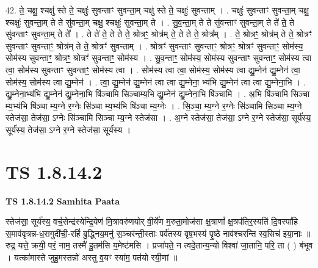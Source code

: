 \documentclass[17pt]{extarticle}
\begin{document}
42. ते॒ चक्षु॒ श्चक्षु॑ स्ते ते॒ चक्षुः॑ सुवन्ताꣳ सुवन्ता॒म् चक्षु॑ स्ते ते॒ चक्षुः॑ सुवन्ताम् । . चक्षुः॑ सुवन्ताꣳ सुवन्ता॒म् चक्षु॒ श्चक्षुः॑ सुवन्ता॒म् ते ते सु॑वन्ता॒म् चक्षु॒ श्चक्षुः॑ सुवन्ता॒म् ते । . सु॒व॒न्ता॒म् ते ते सु॑वन्ताꣳ सुवन्ता॒म् ते ते॑ ते॒ ते सु॑वन्ताꣳ सुवन्ता॒म् ते ते᳚ । . ते ते॑ ते॒ ते ते ते॒ श्रोत्रꣳ॒॒ श्रोत्र॑म् ते॒ ते ते ते॒ श्रोत्र᳚म् । . ते॒ श्रोत्रꣳ॒॒ श्रोत्र॑म् ते ते॒ श्रोत्रꣳ॑ सुवन्ताꣳ सुवन्ताꣳ॒॒ श्रोत्र॑म् ते ते॒ श्रोत्रꣳ॑ सुवन्ताम् । . श्रोत्रꣳ॑ सुवन्ताꣳ सुवन्ताꣳ॒॒ श्रोत्रꣳ॒॒ श्रोत्रꣳ॑ सुवन्ताꣳ॒॒ सोम॑स्य॒ सोम॑स्य सुवन्ताꣳ॒॒ श्रोत्रꣳ॒॒ श्रोत्रꣳ॑ सुवन्ताꣳ॒॒ सोम॑स्य । . सु॒व॒न्ताꣳ॒॒ सोम॑स्य॒ सोम॑स्य सुवन्ताꣳ सुवन्ताꣳ॒॒ सोम॑स्य त्वा त्वा॒ सोम॑स्य सुवन्ताꣳ सुवन्ताꣳ॒॒ सोम॑स्य त्वा । . सोम॑स्य त्वा त्वा॒ सोम॑स्य॒ सोम॑स्य त्वा द्यु॒म्नेन॑ द्यु॒म्नेन॑ त्वा॒ सोम॑स्य॒ सोम॑स्य त्वा द्यु॒म्नेन॑ । . त्वा॒ द्यु॒म्नेन॑ द्यु॒म्नेन॑ त्वा त्वा द्यु॒म्नेना॒ भ्य॑भि द्यु॒म्नेन॑ त्वा त्वा द्यु॒म्नेना॒भि । . द्यु॒म्नेना॒भ्य॑भि द्यु॒म्नेन॑ द्यु॒म्नेना॒भि षि॑ञ्चामि सिञ्चाम्य॒भि द्यु॒म्नेन॑ द्यु॒म्नेना॒भि षि॑ञ्चामि । . अ॒भि षि॑ञ्चामि सिञ्चा म्य॒भ्य॑भि षि॑ञ्चा म्य॒ग्ने र॒ग्नेः सि॑ञ्चा म्य॒भ्य॑भि षि॑ञ्चा म्य॒ग्नेः । . सि॒ञ्चा॒ म्य॒ग्ने र॒ग्नेः सि॑ञ्चामि सिञ्चा म्य॒ग्ने स्तेज॑सा॒ तेज॑सा॒ ऽग्नेः सि॑ञ्चामि सिञ्चा म्य॒ग्ने स्तेज॑सा । . अ॒ग्ने स्तेज॑सा॒ तेज॑सा॒ ऽग्ने र॒ग्ने स्तेज॑सा॒ सूर्य॑स्य॒ सूर्य॑स्य॒ तेज॑सा॒ ऽग्ने र॒ग्ने स्तेज॑सा॒ सूर्य॑स्य । \newline
\pagebreak
{}

\section{ TS 1.8.14.2 }

\textbf{TS 1.8.14.2 } \newline
\textbf{Samhita Paata} \newline

स्तेज॑सा॒ सूर्य॑स्य॒ वर्च॒सेन्द्र॑स्येन्द्रि॒येण॑ मि॒त्रावरु॑णयोर् वी॒र्ये॑ण म॒रुता॒मोज॑सा क्ष॒त्राणां᳚ क्ष॒त्रप॑तिर॒स्यति॑ दि॒वस्पा॑हि स॒माव॑वृत्रन्न-ध॒रागुदी॑ची॒-रहिं॑ बु॒द्ध्निय॒मनु॑ स॒ञ्चर॑न्ती॒स्ताः पर्व॑तस्य वृष॒भस्य॑ पृ॒ष्ठे नाव॑श्चरन्ति स्व॒सिच॑ इया॒नाः ॥ रुद्र॒ यत्ते॒ क्रयी॒ परं॒ नाम॒ तस्मै॑ हु॒तम॑सि य॒मेष्ट॑मसि । प्रजा॑पते॒ न त्वदे॒तान्य॒न्यो विश्वा॑ जा॒तानि॒ परि॒ ता ( ) ब॑भूव । यत्का॑मास्ते जुहु॒मस्तन्नो॑ अस्तु व॒यꣳ स्या॑म॒ पत॑यो रयी॒णां ॥ \newline
\end{document}
